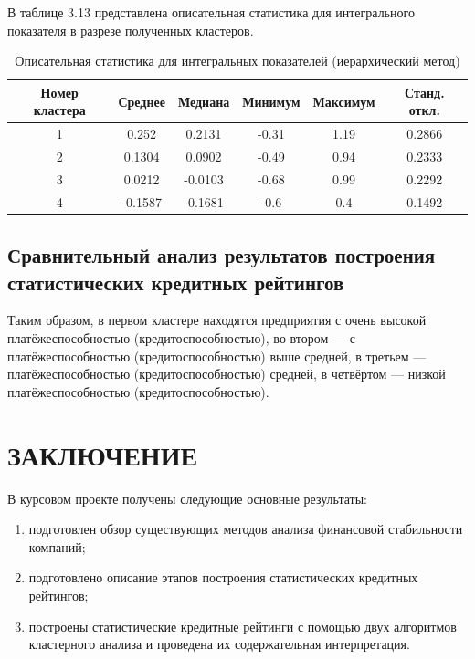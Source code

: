 \documentclass[14pt,a4paper]{extarticle}
\begin{document}
В таблице 3.13 представлена описательная статистика для интегрального показателя в разрезе полученных кластеров.

\begin{table}[H]
    \centering
    \caption{Описательная статистика для интегральных показателей (иерархический метод)}
    \label{tab:desc_hier}
    \begin{tabular}{c|ccccc}
        \toprule
        Номер кластера & Среднее & Медиана & Минимум & Максимум & Станд. откл. \\
        \midrule
        1 & 0.252  & 0.2131 & -0.31 & 1.19 & 0.2866 \\
        2 & 0.1304 & 0.0902 & -0.49 & 0.94 & 0.2333 \\
        3 & 0.0212 & -0.0103& -0.68 & 0.99 & 0.2292 \\
        4 & -0.1587& -0.1681& -0.6  & 0.4  & 0.1492 \\
        \bottomrule
    \end{tabular}
\end{table}

\subsection{Сравнительный анализ результатов построения статистических кредитных рейтингов}

Таким образом, в первом кластере находятся предприятия с очень высокой платёжеспособностью (кредитоспособностью), во втором --- с платёжеспособностью (кредитоспособностью) выше средней, в третьем --- платёжеспособностью (кредитоспособностью) средней, в четвёртом --- низкой платёжеспособностью (кредитоспособностью).

\clearpage

\section*{ЗАКЛЮЧЕНИЕ}

В курсовом проекте получены следующие основные результаты:
\begin{enumerate}
    \item подготовлен обзор существующих методов анализа финансовой стабильности компаний;
    \item подготовлено описание этапов построения статистических кредитных рейтингов;
    \item построены статистические кредитные рейтинги с помощью двух алгоритмов кластерного анализа и проведена их содержательная интерпретация.
\end{enumerate}
\end{document}

